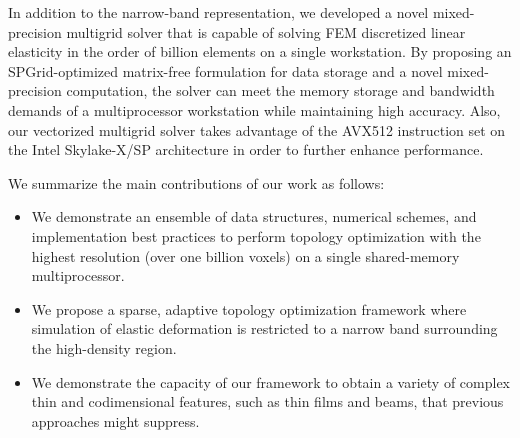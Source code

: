 In addition to the narrow-band representation, we developed a novel mixed-precision multigrid solver that is capable of solving FEM discretized linear elasticity in the order of billion elements on a single workstation.
By proposing an SPGrid-optimized matrix-free formulation for data storage and a novel mixed-precision computation, the solver can meet the memory storage and bandwidth demands of a multiprocessor workstation while maintaining high accuracy.
Also, our vectorized multigrid solver takes advantage of the AVX512 instruction set on the Intel Skylake-X/SP architecture in order to further enhance performance.

We summarize the main contributions of our work as follows:
\begin{itemize}
\item We demonstrate an ensemble of data structures, numerical schemes, and implementation best practices to perform topology optimization with the highest resolution (over one billion voxels) on a single shared-memory multiprocessor.
\item We propose a sparse, adaptive topology optimization framework where simulation of elastic deformation is restricted to a narrow band surrounding the high-density region.
\item We demonstrate the capacity of our framework to obtain a variety of complex thin and codimensional features, such as thin films and beams, that previous approaches might suppress.
\end{itemize}